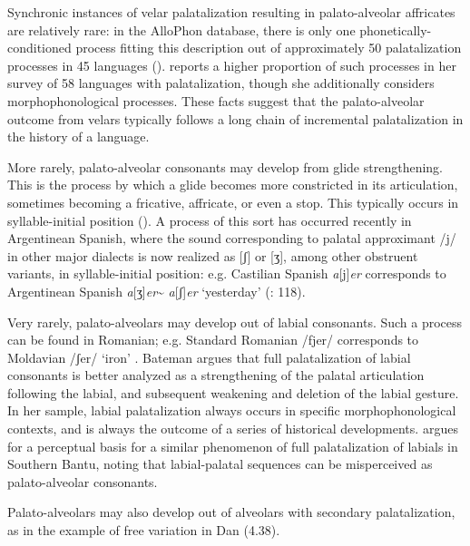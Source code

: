   Synchronic instances of velar palatalization resulting in palato-alveolar affricates are relatively rare: in the AlloPhon database, there is only one phonetically-conditioned process fitting this description out of approximately 50 palatalization processes in 45 languages (\citealt{BybeeEasterday2019}). \citet{Bateman2007} reports a higher proportion of such processes in her survey of 58 languages with palatalization, though she additionally considers morphophonological processes. These facts suggest that the palato-alveolar outcome from velars typically follows a long chain of incremental palatalization in the history of a language.



  More rarely, palato-alveolar consonants may develop from glide strengthening. This is the process by which a glide becomes more constricted in its articulation, sometimes becoming a fricative, affricate, or even a stop. This typically occurs in syllable-initial position (\citealt{BybeeEasterday2019}). A process of this sort has occurred recently in Argentinean Spanish, where the sound corresponding to palatal approximant /j/ in other major dialects is now realized as [ʃ] or [ʒ], among other obstruent variants, in syllable-initial position: e.g. Castilian Spanish \textit{a}[j]\textit{er} corresponds to Argentinean Spanish \textit{a}[ʒ]\textit{er}{\textasciitilde} \textit{a}[ʃ]\textit{er} ‘yesterday’ (\citealt{HarrisKaisse1999}: 118).



  Very rarely, palato-alveolars may develop out of labial consonants. Such a process can be found in Romanian; e.g. Standard Romanian /fjer/ corresponds to Moldavian /ʃer/ ‘iron’ \citep[108]{Bateman2007}. Bateman argues that full palatalization of labial consonants is better analyzed as a strengthening of the palatal articulation following the labial, and subsequent weakening and deletion of the labial gesture. In her sample, labial palatalization always occurs in specific morphophonological contexts, and is always the outcome of a series of historical developments. \citet{Ohala1978} argues for a perceptual basis for a similar phenomenon of full palatalization of labials in Southern Bantu, noting that labial-palatal sequences can be misperceived as palato-alveolar consonants.



  Palato-alveolars may also develop out of alveolars with secondary palatalization, as in the example of free variation in Dan (4.38).



